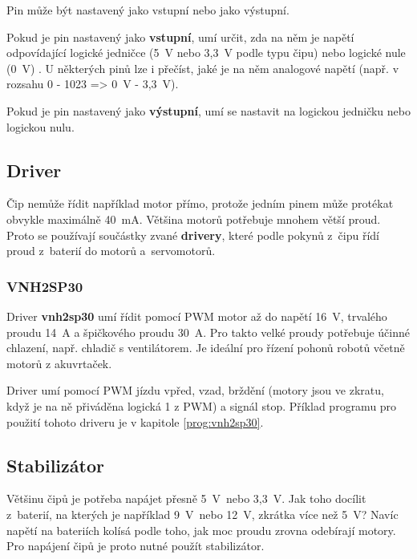 Pin může být nastavený jako vstupní nebo jako výstupní. 

Pokud je pin nastavený jako {\bf vstupní}, umí určit, zda na něm je napětí odpovídající logické jedničce (5~V nebo 3,3~V podle typu čipu) nebo logické nule (0~V) . 
U některých pinů lze i přečíst, jaké je na něm analogové napětí (např. v rozsahu 0 - 1023 => 0~V - 3,3~V). 

Pokud je pin nastavený jako {\bf výstupní},  umí se nastavit na logickou jedničku nebo logickou nulu. 

\subsection{Driver} \label{driver}

Čip nemůže řídit například motor přímo, protože jedním pinem může protékat obvykle maximálně 40~mA. 
Většina motorů potřebuje mnohem větší proud.
 Proto se používají součástky zvané {\bf drivery}, které podle pokynů z~čipu řídí proud z~baterií do motorů a~servomotorů. 
 
\label{vnh2sp30} \subsubsection{VNH2SP30}
 
 Driver {\bf vnh2sp30}  umí řídit pomocí PWM motor až do napětí 16~V, trvalého proudu 14~A a špičkového proudu 30~A. Pro takto velké proudy potřebuje účinné chlazení, např. chladič s ventilátorem. Je ideální pro řízení pohonů robotů včetně motorů z akuvrtaček. 
 
 Driver umí pomocí PWM jízdu vpřed, vzad, brždění (motory jsou ve zkratu, když je na ně přiváděna logická 1 z PWM) a signál stop. Příklad programu pro použití tohoto driveru je v kapitole \ref{prog:vnh2sp30}. 
 

\subsection{Stabilizátor}  \label{stabilizator}

Většinu čipů je potřeba napájet přesně 5~V~nebo 3,3~V. Jak toho docílit z~baterií, na kterých je například 9~V~nebo 12~V, zkrátka více než 5~V? 
Navíc napětí na bateriích kolísá podle toho, jak moc proudu zrovna odebírají motory. 
Pro napájení čipů je proto nutné použít stabilizátor. 

